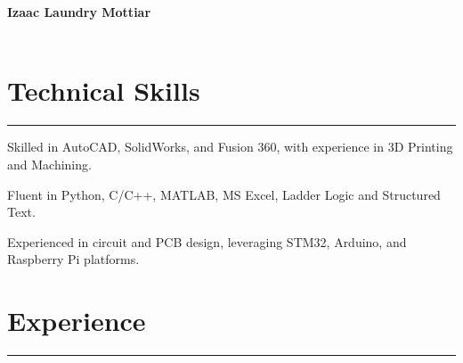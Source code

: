 \documentclass{article}
\begin{document}
\begin{tcolorbox}[colback=blue!5!white,colframe=blue!5!white, arc=0mm]
\begin{center}
\textbf{\Huge Izaac Laundry Mottiar} \\
\vspace{0.15cm}
 \\
\vspace{0.15cm}
\end{center}
\end{tcolorbox}


\vspace{-0.5cm}
\section*{\hspace{0.2cm} \large Technical Skills}
\begin{center}
    \vspace{-0.5cm}
    \rule{\textwidth}{0.1pt}
\end{center}

\begin{description}
    \vspace{-0.5cm}
    \item[\hspace{0.5cm}Mechanical:] Skilled in AutoCAD, SolidWorks, and Fusion 360, with experience in 3D Printing and Machining.
    \vspace{-0.2cm}
    \item[\hspace{0.5cm}Programming:] Fluent in Python, C/C++, MATLAB, MS Excel, Ladder Logic and Structured Text.
    \vspace{-0.2cm}
    \item[\hspace{0.5cm}Electrical:] Experienced in circuit and PCB design, leveraging STM32, Arduino, and Raspberry Pi platforms.
\end{description}


\vspace{-0.5cm}     
\section*{\hspace{0.2cm} \large Experience}
\begin{center}
    \vspace{-0.5cm}
    \rule{\textwidth}{0.1pt}
\end{center}
\end{document}
